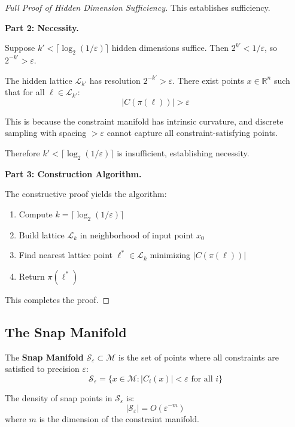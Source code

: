 \documentclass{article}
\begin{document}
\begin{proof}[Full Proof of Hidden Dimension Sufficiency]
This establishes sufficiency.

\textbf{Part 2: Necessity.}

Suppose $k' < \lceil \log_2(1/\varepsilon) \rceil$ hidden dimensions suffice. Then $2^{k'} < 1/\varepsilon$, so $2^{-k'} > \varepsilon$.

The hidden lattice $\mathcal{L}_{k'}$ has resolution $2^{-k'} > \varepsilon$. There exist points $x \in \mathbb{R}^n$ such that for all $\ell \in \mathcal{L}_{k'}$:
\begin{equation}
|C(\pi(\ell))| > \varepsilon
\end{equation}

This is because the constraint manifold has intrinsic curvature, and discrete sampling with spacing $> \varepsilon$ cannot capture all constraint-satisfying points.

Therefore $k' < \lceil \log_2(1/\varepsilon) \rceil$ is insufficient, establishing necessity.

\textbf{Part 3: Construction Algorithm.}

The constructive proof yields the algorithm:
\begin{enumerate}
    \item Compute $k = \lceil \log_2(1/\varepsilon) \rceil$
    \item Build lattice $\mathcal{L}_k$ in neighborhood of input point $x_0$
    \item Find nearest lattice point $\ell^* \in \mathcal{L}_k$ minimizing $|C(\pi(\ell))|$
    \item Return $\pi(\ell^*)$
\end{enumerate}

This completes the proof.
\end{proof}

\subsection{The Snap Manifold}

\begin{definition}
The \textbf{Snap Manifold} $\mathcal{S}_\varepsilon \subset \mathcal{M}$ is the set of points where all constraints are satisfied to precision $\varepsilon$:
\begin{equation}
\mathcal{S}_\varepsilon = \{x \in \mathcal{M} : |C_i(x)| < \varepsilon \text{ for all } i\}
\end{equation}
\end{definition}

\begin{theorem}
The density of snap points in $\mathcal{S}_\varepsilon$ is:
\begin{equation}
|\mathcal{S}_\varepsilon| = O(\varepsilon^{-m})
\end{equation}
where $m$ is the dimension of the constraint manifold.
\end{theorem}
\end{document}
